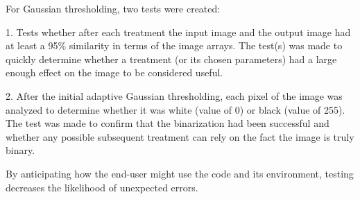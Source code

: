 \begin{enumerate}
For Gaussian thresholding, two tests were created:

1. Tests whether after each treatment the input image and the output image had at least a 95\% similarity in terms of the image arrays. The test(s) was made to quickly determine whether a treatment (or its chosen parameters) had a large enough effect on the image to be considered useful.

2. After the initial adaptive Gaussian thresholding, each pixel of the image was analyzed to determine whether it was white (value of 0) or black (value of 255). The test was made to confirm that the binarization had been successful and whether any possible subsequent treatment can rely on the fact the image is truly binary.



By anticipating how the end-user might use the code and its environment, testing decreases the likelihood of unexpected errors. 



\end{enumerate}


